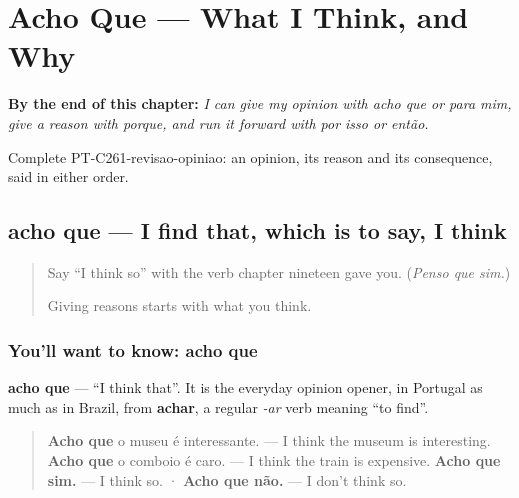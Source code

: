
\chapter{Acho Que --- What I Think, and Why}
\label{ch:pt-what-i-think-and-why}

\begin{chapteropening}
\textbf{By the end of this chapter:} \emph{I can give my opinion with acho que or para mim, give a reason with porque, and run it forward with por isso or então.}

Complete PT-C261-revisao-opiniao: an opinion, its reason and its consequence, said in either order.
\end{chapteropening}

\section[acho que, para mim]{acho que — I find that, which is to say, I think}

\label{lesson:PT-C261-acho-que}



\begin{quote}
Say \textquotedblleft{}I think so\textquotedblright{} with the verb chapter nineteen gave you. (\emph{Penso que sim.})

Giving reasons starts with what you think.
\end{quote}

\subsection*{You'll want to know: acho que}
\textbf{acho que} — \textquotedblleft{}I think that\textquotedblright{}. It is the everyday opinion opener, in Portugal as much as in Brazil, from \textbf{achar}, a regular \emph{-ar} verb meaning \textquotedblleft{}to find\textquotedblright{}.

\begin{quote}
\textbf{Acho que} o museu é interessante. — I think the museum is interesting. \textbf{Acho que} o comboio é caro. — I think the train is expensive. \textbf{Acho que sim.} — I think so. · \textbf{Acho que não.} — I don't think so.
\end{quote}

